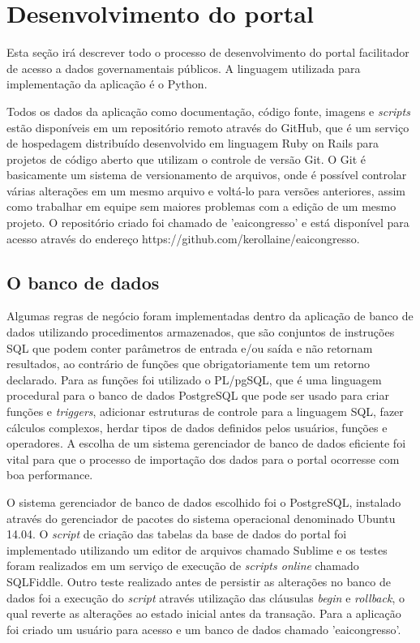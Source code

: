 \documentclass[
	12pt,				%
	openright,			%
	twoside,			%
	a4paper,			%
	english,			%
	french,				%
	spanish,			%
	brazil				%
	]{abntex2}
\begin{document}
\chapter{Desenvolvimento do portal}
Esta seção irá descrever todo o processo de desenvolvimento do portal facilitador de acesso a dados governamentais públicos. A linguagem utilizada para implementação 
da aplicação é o Python.

Todos os dados da aplicação como documentação, código fonte, imagens e \emph{scripts} estão disponíveis em 
um repositório remoto através do GitHub, que é um serviço de hospedagem distribuído desenvolvido em linguagem Ruby on Rails para projetos de código aberto que
utilizam o controle de versão Git. O Git é basicamente um sistema de versionamento de arquivos, onde é possível controlar várias alterações em um mesmo arquivo e voltá-lo para versões anteriores, assim como trabalhar em equipe sem maiores 
problemas com a edição de um mesmo projeto.
O repositório criado foi chamado de 'eaicongresso' e está disponível para acesso através do endereço https://github.com/kerollaine/eaicongresso.

\section{O banco de dados}
Algumas regras de negócio foram implementadas dentro da aplicação de banco de dados utilizando procedimentos armazenados, que são conjuntos
de instruções SQL que podem conter parâmetros de entrada e/ou saída e não retornam resultados, ao contrário de funções que 
obrigatoriamente tem um retorno declarado. Para as funções foi utilizado o PL/pgSQL, que é uma linguagem procedural para o banco de 
dados PostgreSQL que pode ser usado para criar funções e \emph{triggers}, adicionar estruturas de controle para a 
linguagem SQL, fazer cálculos complexos, herdar tipos de dados definidos pelos usuários, funções e operadores. A escolha de um sistema 
gerenciador de banco de dados eficiente foi vital para que o processo de importação dos dados para o portal ocorresse com boa performance. 

O sistema gerenciador de banco de dados escolhido foi o PostgreSQL, instalado através do gerenciador de pacotes do sistema operacional denominado Ubuntu 14.04.
O \emph{script} de criação das tabelas da base de dados do portal foi implementado utilizando um editor de arquivos chamado Sublime e os testes foram realizados em um serviço
de execução de \emph{scripts online} chamado SQLFiddle. Outro teste realizado antes de persistir as alterações no banco de dados foi a execução do \emph{script} através utilização das cláusulas \emph{begin} e \emph{rollback}, o qual reverte as alterações ao estado inicial antes da transação. Para 
a aplicação foi criado um usuário para acesso e um banco de dados chamado 'eaicongresso'. 
\end{document}
